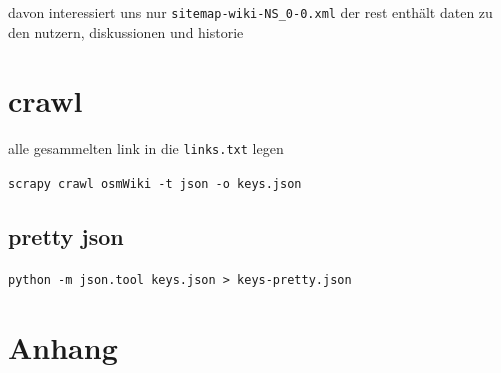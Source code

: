 \documentclass[12pt,pdftex,a4paper]{article}
\begin{document}
davon interessiert uns nur \texttt{sitemap-wiki-NS\_0-0.xml} der rest enthält daten zu den nutzern, diskussionen und historie

\section{crawl}
alle gesammelten link in die \texttt{links.txt} legen

\texttt{scrapy crawl osmWiki -t json -o keys.json}

\subsection{pretty json}
\texttt{python -m json.tool keys.json > keys-pretty.json}


\pagebreak
\section{Anhang}




\end{document}
